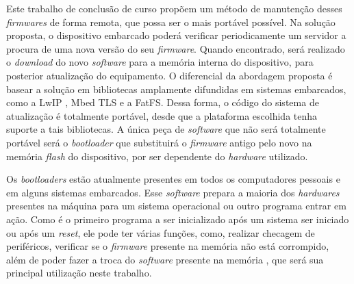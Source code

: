 
Este trabalho de conclusão de curso propõem um método de manutenção desses \textit{firmwares} de forma remota, que possa ser o mais portável possível.
Na solução proposta, o dispositivo embarcado poderá verificar periodicamente um servidor a procura de uma nova versão do seu \textit{firmware}. Quando encontrado, será realizado o \textit{download} do novo \textit{software} para a memória interna do dispositivo, para posterior atualização do equipamento. O diferencial da abordagem proposta é basear a solução em bibliotecas amplamente difundidas em sistemas embarcados, como a LwIP \cite{LWIP}, Mbed TLS \cite{mbedtls} e a FatFS\cite{FATFS}. Dessa forma, o código do sistema de atualização é totalmente portável, desde que a plataforma escolhida tenha suporte a tais bibliotecas. A única peça de \textit{software} que não será totalmente portável será o \textit{bootloader} que substituirá o \textit{firmware} antigo pelo novo na memória \textit{flash} do dispositivo, por ser dependente do \textit{hardware} utilizado.

 

Os \textit{bootloaders} estão atualmente presentes em todos os computadores pessoais e em alguns sistemas embarcados. Esse \textit{software} prepara a maioria dos \textit{hardwares} presentes na máquina para um sistema operacional ou outro programa entrar em ação.
Como é o primeiro programa a ser inicializado após um sistema ser iniciado ou após um \textit{reset}, ele pode ter várias funções, como, realizar checagem de periféricos, verificar se o \textit{firmware} presente na memória não está corrompido, além de poder fazer a troca do \textit{software} presente na memória \cite{DavesDurlin2013}, que será sua principal utilização neste trabalho.

